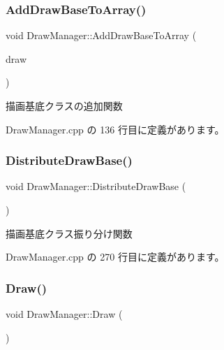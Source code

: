 \mbox{\label{class_draw_manager_a9dbd645fdbf927cd43d400335ff9b286}} 
\subsubsection{\texorpdfstring{Add\+Draw\+Base\+To\+Array()}{AddDrawBaseToArray()}}
{\footnotesize\ttfamily void Draw\+Manager\+::\+Add\+Draw\+Base\+To\+Array (\begin{DoxyParamCaption}\item[{\mbox{\hyperlink{class_draw_base}{Draw\+Base}} $\ast$}]{draw }\end{DoxyParamCaption})}



描画基底クラスの追加関数 



 Draw\+Manager.\+cpp の 136 行目に定義があります。

\mbox{\label{class_draw_manager_a9a09cb524187bc11f1e4812a06fe46d6}} 
\subsubsection{\texorpdfstring{Distribute\+Draw\+Base()}{DistributeDrawBase()}}
{\footnotesize\ttfamily void Draw\+Manager\+::\+Distribute\+Draw\+Base (\begin{DoxyParamCaption}{ }\end{DoxyParamCaption})\hspace{0.3cm}{\ttfamily [private]}}



描画基底クラス振り分け関数 



 Draw\+Manager.\+cpp の 270 行目に定義があります。

\mbox{\label{class_draw_manager_a43372495e68d77a2698f211cf921b37e}} 
\subsubsection{\texorpdfstring{Draw()}{Draw()}}
{\footnotesize\ttfamily void Draw\+Manager\+::\+Draw (\begin{DoxyParamCaption}{ }\end{DoxyParamCaption})}



